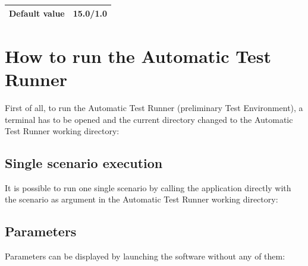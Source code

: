 \begin{itemize}
\begin{longtable}{|l|l|}
		\hline
		
		\begin{minipage}[t]{0.22\linewidth} \textbf{Default value}	\end{minipage}
		&	\begin{minipage}[t]{0.78\linewidth} 15.0/1.0 \end{minipage} \\
		
		\hline
	\end{longtable}
	
\end{itemize}

	
\chapter{How to run the Automatic Test Runner}
First of all, to run the Automatic Test Runner (preliminary Test Environment), a terminal has to be opened and the current directory changed to the Automatic Test Runner working directory:
\newline
{}
\section{Single scenario execution}
It is possible to run one single scenario by calling the application directly with the scenario as argument in the Automatic Test Runner working directory:
\newline
{}
\section{Parameters}
Parameters can be displayed by launching the software without any of them:
\newline
{}
\newpage
